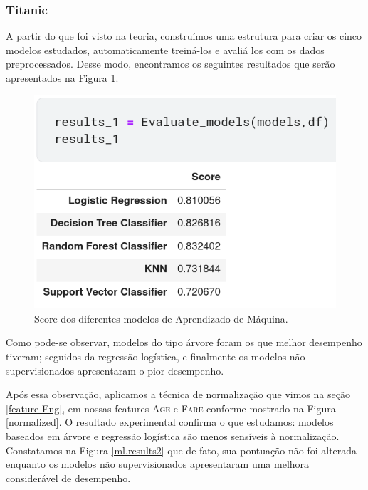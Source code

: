 \subsubsection{Titanic}
A partir do que foi visto na teoria, construímos uma estrutura para criar os cinco modelos estudados, automaticamente treiná-los e avaliá los com os dados preprocessados. Desse modo, encontramos os seguintes resultados que serão apresentados na Figura \ref{ml.results}.
\begin{figure}[H]
\centering
\includegraphics[width=\textwidth]{Figures/results_1.png}
\caption{\label{ml.results}Score dos diferentes modelos de Aprendizado de Máquina.}
\end{figure}

Como pode-se observar, modelos do tipo árvore foram os que melhor desempenho tiveram; seguidos da regressão logística, e finalmente os modelos não-supervisionados apresentaram o pior desempenho.

Após essa observação, aplicamos a técnica de normalização que vimos na seção \ref{feature-Eng}, em nossas features \textsc{Age} e \textsc{Fare} conforme mostrado na Figura \ref{normalized}. O resultado experimental confirma o que estudamos: modelos baseados em árvore e regressão logística são menos sensíveis à normalização. Constatamos na Figura \ref{ml.results2} que de fato, sua pontuação não foi alterada enquanto os modelos não supervisionados apresentaram uma melhora considerável de desempenho. 

